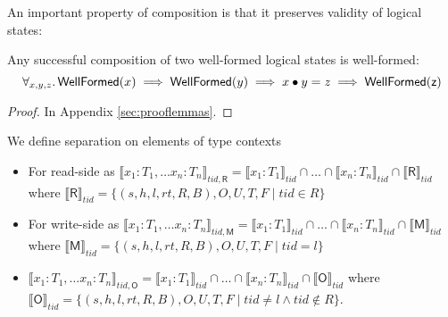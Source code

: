 An important property of composition is that it preserves validity of logical states:
\begin{lemma}
\label{lem:wf-composition}
Any successful composition of two well-formed logical states is well-formed:\[\forall_{x,y,z}\ldotp \mathsf{WellFormed}(x) \implies \mathsf{WellFormed}(y) \implies x\bullet y = z \implies \mathsf{WellFormed(z)}\]
\end{lemma}
\begin{proof}
In Appendix \ref{sec:prooflemmas}.
  \end{proof}
We define separation on elements of type contexts
\begin{itemize}
\item For read-side as $\llbracket x_1 : T_1, \ldots x_n : T_n \rrbracket_{tid,\textsf{R}} = \llbracket x_1 : T_1 \rrbracket_{tid} \cap \ldots \cap \llbracket x_n : T_n \rrbracket_{tid} \cap \llbracket \textsf{R} \rrbracket_{tid}$ where
$\llbracket \textsf{R} \rrbracket_{tid} = \{ (s,h,l,rt,R,B),O,U,T,F  \mid tid \in R \}$

\item For write-side as $\llbracket x_1 : T_1, \ldots x_n : T_n \rrbracket_{tid,\textsf{M}} = \llbracket x_1 : T_1 \rrbracket_{tid} \cap \ldots \cap \llbracket x_n : T_n \rrbracket_{tid} \cap \llbracket \textsf{M} \rrbracket_{tid}$ where
$\llbracket \textsf{M} \rrbracket_{tid} = \{ (s,h,l,rt,R,B),O,U,T,F  \mid tid = l \}$

\item $\llbracket x_1 : T_1, \ldots x_n : T_n \rrbracket_{tid,\textsf{O}} = \llbracket x_1 : T_1 \rrbracket_{tid} \cap \ldots \cap \llbracket x_n : T_n \rrbracket_{tid} \cap \llbracket \textsf{O} \rrbracket_{tid}$ where
$\llbracket \textsf{O} \rrbracket_{tid} = \{ (s,h,l,rt,R,B),O,U,T,F  \mid tid \neq l \land tid \notin R \}$.
\end{itemize}

